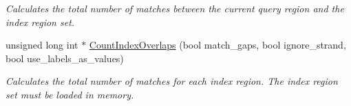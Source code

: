 \begin{DoxyCompactItemize}
\begin{DoxyCompactList}\small\item\em Calculates the total number of matches between the current query region and the index region set. \end{DoxyCompactList}\item 
unsigned long int $\ast$ \hyperlink{classGenomicRegionSetOverlaps_a4b004114f9868c6a077d9207bd9b1901}{CountIndexOverlaps} (bool match\_\-gaps, bool ignore\_\-strand, bool use\_\-labels\_\-as\_\-values)
\begin{DoxyCompactList}\small\item\em Calculates the total number of matches for each index region. The index region set must be loaded in memory. \end{DoxyCompactList}\end{DoxyCompactItemize}
